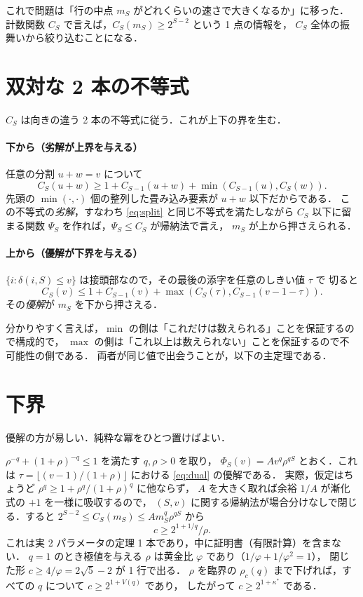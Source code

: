\documentclass[a4paper,11pt]{jsarticle}
\begin{document}
これで問題は「行の中点 $m_S$ がどれくらいの速さで大きくなるか」に移った．
計数関数 $C_S$ で言えば，$C_S(m_S) \ge 2^{S-2}$ という 1 点の情報を，
$C_S$ 全体の振舞いから絞り込むことになる．

\section{双対な 2 本の不等式}
$C_S$ は向きの違う 2 本の不等式に従う．これが上下の界を生む．

\paragraph{下から（劣解が上界を与える）}
任意の分割 $u + w = v$ について
\begin{equation}
C_S(u{+}w) \ge 1 + C_{S-1}(u{+}w) + \min(C_{S-1}(u), C_S(w)).
\label{eq:split}
\end{equation}
先頭の $\min(\cdot,\cdot)$ 個の整列した畳み込み要素が $u{+}w$ 以下だからである．
この不等式の\emph{劣解}，すなわち \eqref{eq:split} と同じ不等式を満たしながら
$C_S$ 以下に留まる関数 $\Psi_S$ を作れば，$\Psi_S \le C_S$ が帰納法で言え，
$m_S$ が上から押さえられる．

\paragraph{上から（優解が下界を与える）}
$\{i : \delta(i,S) \le v\}$ は接頭部なので，その最後の添字を任意のしきい値 $\tau$ で
切ると
\begin{equation}
C_S(v) \le 1 + C_{S-1}(v) + \max(C_S(\tau), C_{S-1}(v{-}1{-}\tau)).
\label{eq:dual}
\end{equation}
その\emph{優解}が $m_S$ を下から押さえる．

分かりやすく言えば，$\min$ の側は「これだけは数えられる」ことを保証するので構成的で，
$\max$ の側は「これ以上は数えられない」ことを保証するので不可能性の側である．
両者が同じ値で出会うことが，以下の主定理である．

\section{下界}
優解の方が易しい．純粋な冪をひとつ置けばよい．

$\rho^{-q} + (1{+}\rho)^{-q} \le 1$ を満たす $q, \rho > 0$ を取り，
$\Phi_S(v) = A v^q \rho^{qS}$ とおく．これは
$\tau = \lfloor(v{-}1)/(1{+}\rho)\rfloor$ における \eqref{eq:dual} の優解である．
実際，仮定はちょうど $\rho^q \ge 1 + \rho^q/(1{+}\rho)^q$ に他ならず，
$A$ を大きく取れば余裕 $1/A$ が漸化式の $+1$ を一様に吸収するので，
$(S,v)$ に関する帰納法が場合分けなしで閉じる．すると
$2^{S-2} \le C_S(m_S) \le A m_S^q \rho^{qS}$ から
\[
c \ge 2^{1+1/q}/\rho .
\]
これは実 2 パラメータの定理 1 本であり，中に証明書（有限計算）を含まない．
$q = 1$ のとき極値を与える $\rho$ は黄金比 $\varphi$ であり（$1/\varphi + 1/\varphi^2 = 1$），
閉じた形 $c \ge 4/\varphi = 2\sqrt5 - 2$ が 1 行で出る．
$\rho$ を臨界の $\rho_c(q)$ まで下げれば，すべての $q$ について $c \ge 2^{1+V(q)}$ であり，
したがって $c \ge 2^{1+\kappa^*}$ である．
\end{document}
